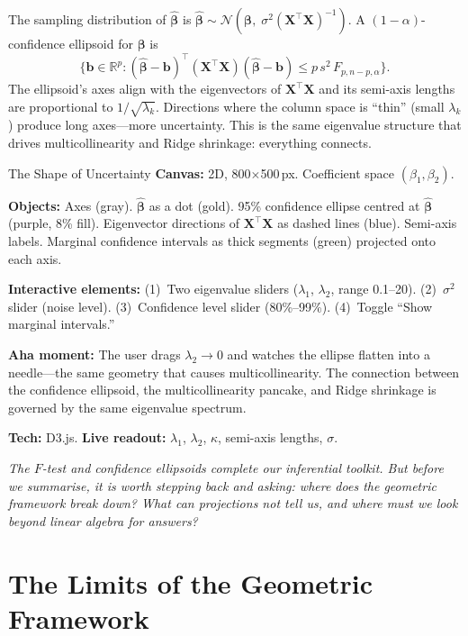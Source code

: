 \documentclass[11pt,a4paper]{article}
\theoremstyle{plain}
\theoremstyle{definition}
\newcommand{\R}{\mathbb{R}}
\newcommand{\bhat}{\hat{\bm{\beta}}}
\newcommand{\bX}{\bm{X}}
\begin{document}
The sampling distribution of $\bhat$ is
$\bhat\sim\mathcal{N}(\bm{\beta},\;\sigma^2(\bX^\top\bX)^{-1})$.
A $(1-\alpha)$-confidence ellipsoid for $\bm{\beta}$ is
\[
  \bigl\{\bm{b}\in\R^p :
  (\bhat-\bm{b})^\top(\bX^\top\bX)(\bhat-\bm{b})
  \le p\,s^2\,F_{p,n-p,\alpha}
  \bigr\}.
\]
The ellipsoid's axes align with the eigenvectors of $\bX^\top\bX$
and its semi-axis lengths are proportional to $1/\sqrt{\lambda_k}$.
Directions where the column space is ``thin'' (small $\lambda_k$)
produce long axes---more uncertainty.
This is the same eigenvalue structure that drives multicollinearity
and Ridge shrinkage: everything connects.

\begin{vizspec}{The Shape of Uncertainty}
\textbf{Canvas:} 2D, 800$\times$500\,px.  Coefficient space
$(\beta_1, \beta_2)$.

\textbf{Objects:} Axes (\textcolor{secondary}{gray}).  $\bhat$ as a dot
(\textcolor{response}{gold}).  95\% confidence ellipse centred at
$\bhat$ (\textcolor{constraint}{purple}, 8\% fill).  Eigenvector
directions of $\bX^\top\bX$ as dashed lines (\textcolor{colspace}{blue}).
Semi-axis labels.  Marginal confidence intervals as thick segments
(\textcolor{projection}{green}) projected onto each axis.

\textbf{Interactive elements:}
(1)~Two eigenvalue sliders ($\lambda_1$, $\lambda_2$, range 0.1--20).
(2)~$\sigma^2$ slider (noise level).
(3)~Confidence level slider (80\%--99\%).
(4)~Toggle ``Show marginal intervals.''

\textbf{Aha moment:} The user drags $\lambda_2 \to 0$ and watches the
ellipse flatten into a needle---the same geometry that causes
multicollinearity.  The connection between the confidence ellipsoid,
the multicollinearity pancake, and Ridge shrinkage is governed by the
same eigenvalue spectrum.

\textbf{Tech:} D3.js.
\quad \textbf{Live readout:} $\lambda_1$, $\lambda_2$, $\kappa$,
semi-axis lengths, $\sigma$.
\end{vizspec}

\medskip
\noindent\textit{The $F$-test and confidence ellipsoids complete our
inferential toolkit.
But before we summarise, it is worth stepping back and asking:
where does the geometric framework \emph{break down}?
What can projections not tell us, and where must we look beyond
linear algebra for answers?}


\section{The Limits of the Geometric Framework}\label{sec:limits}
\end{document}

